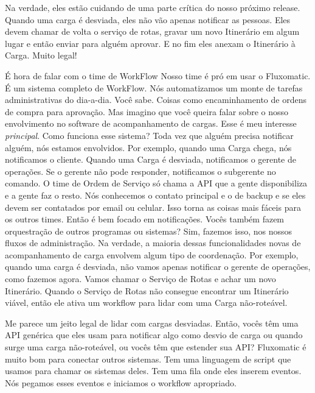 \documentclass[12pt,play]{article}
\begin{document}
Na verdade, eles estão cuidando de uma parte crítica do nosso próximo release. Quando uma carga é desviada, eles não vão apenas notificar as pessoas. Eles devem chamar de volta o serviço de rotas, gravar um novo Itinerário em algum lugar e então enviar para alguém aprovar. E no fim eles anexam o Itinerário à Carga. Muito legal!
\narr {}

\scene
\narr É hora de falar com o time de WorkFlow
\clau Nosso time é pró em usar o Fluxomatic. É um sistema completo de WorkFlow. Nós automatizamos um monte de tarefas administrativas do dia-a-dia. Você sabe. Coisas como encaminhamento de ordens de compra para aprovação. Mas imagino que você queira falar sobre o nosso envolvimento no software de acompanhamento de cargas.
\dani Esse é meu interesse \emph{principal}. Como funciona esse sistema?
\clau Toda vez que alguém precisa notificar alguém, nós estamos envolvidos. Por exemplo, quando uma Carga chega, nós notificamos o cliente. Quando uma Carga é desviada, notificamos o gerente de operações. Se o gerente não pode responder, notificamos o subgerente no comando. O time de Ordem de Serviço só chama a API que a gente disponibiliza e a gente faz o resto. Nós conhecemos o contato principal e o de backup e se eles devem ser contatados por email ou celular. Isso torna as coisas mais fáceis para os outros times.
\dani Então é bem focado em notificações. Vocês também fazem orquestração de outros programas ou sistemas?
\clau Sim, fazemos isso, nos nossos fluxos de administração. Na verdade, a maioria dessas funcionalidades novas de acompanhamento de carga envolvem algum tipo de coordenação. Por exemplo, quando uma carga é desviada, não vamos apenas notificar o gerente de operações, como fazemos agora. Vamos chamar o Serviço de Rotas e achar um novo Itinerário. Quando o Serviço de Rotas não consegue encontrar um Itinerário viável, então ele ativa um workflow para lidar com uma Carga não-roteável.

\narr {}


\dani Me parece um jeito legal de lidar com cargas desviadas. Então, vocês têm uma API genérica que eles usam para notificar algo como desvio de carga ou quando surge uma carga não-roteável, ou vocês têm que estender sua API?
\clau Fluxomatic é muito bom para conectar outros sistemas. Tem uma linguagem de script que usamos para chamar os sistemas deles. Tem uma fila onde eles inserem eventos. Nós pegamos esses eventos e iniciamos o workflow apropriado.
\end{document}
